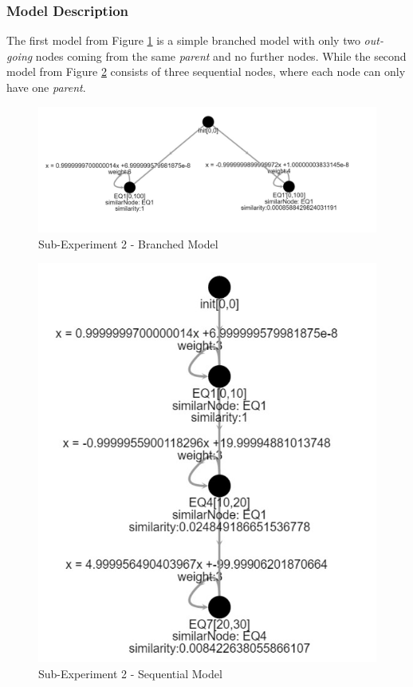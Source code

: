 \subsubsection{ Model Description }
The first model from Figure \ref{combination_experiment_simple_1} is a simple branched model with only two \textit{out-going} nodes coming from the same \textit{parent} and no further nodes. While the second model from Figure \ref{combination_experiment_simple_2} consists of three sequential nodes, where each node can only have one \textit{parent}.
\begin{figure}[t]
	\centering
	\includegraphics[scale=0.4]{./pictures/simple_experiment/learnedModel_branched_far.png}
	\caption{Sub-Experiment 2 - Branched Model}
	\label{combination_experiment_simple_1}
\end{figure}

\begin{figure}[h]
	\centering
	\includegraphics[scale=0.4]{./pictures/simple_experiment/learnedModel_sequential_far.png}
	\caption{Sub-Experiment 2 - Sequential Model}
	\label{combination_experiment_simple_2}
\end{figure}

